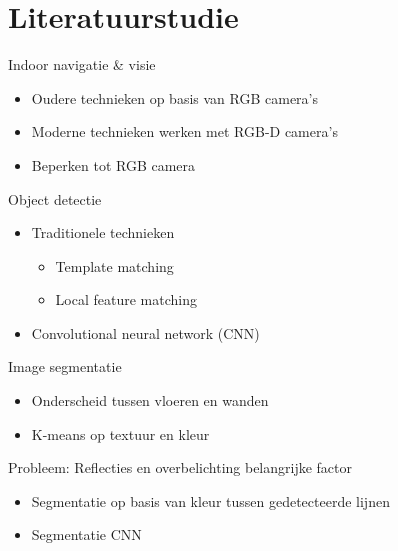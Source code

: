 \documentclass[11pt,t]{beamer}
\begin{document}
 \section{Literatuurstudie}
 \begin{frame}[fragile]{Indoor navigatie \& visie}
	\begin{itemize}
		\item Oudere technieken op basis van RGB camera's
		\item Moderne technieken werken met RGB-D camera's
		\item Beperken tot RGB camera
	\end{itemize}
 \end{frame}

 \begin{frame}[fragile]{Object detectie}
	\begin{itemize}
		\item Traditionele technieken
		\begin{itemize}
			\item Template matching
			\item Local feature matching
		\end{itemize}
		\item Convolutional neural network (CNN)
	\end{itemize}
 \end{frame}


 \begin{frame}[fragile]{Image segmentatie}
	\begin{itemize}
		\item Onderscheid tussen vloeren en wanden
		\item K-means op textuur en kleur
	\end{itemize}
		Probleem: Reflecties en overbelichting belangrijke factor
	\begin{itemize}
		\item Segmentatie op basis van kleur tussen gedetecteerde lijnen
		\item Segmentatie CNN
	\end{itemize}
 \end{frame}
\end{document}

